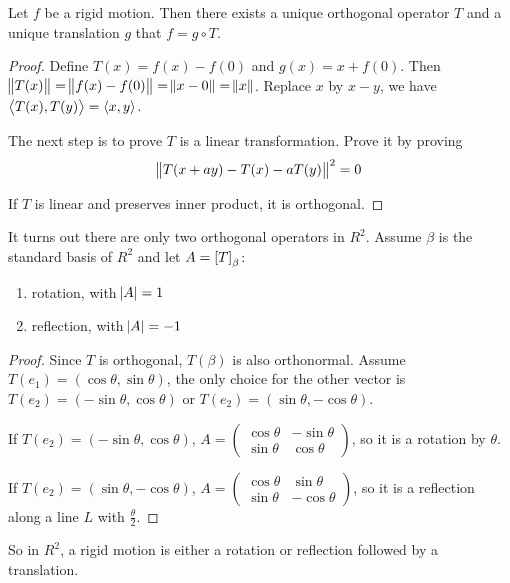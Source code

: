 \begin{theorem}
    Let $f$ be a rigid motion. Then there exists a unique orthogonal operator $T$ and a unique translation $g$ that $f = g  \circ T$.
\end{theorem}
\begin{proof}
    Define $T(x) = f(x) - f(0)$ and $g(x) = x + f(0)$. Then $\norm{T(x)} = \norm{f(x) - f(0)} = \norm{x - 0} = \norm{x}$. Replace $x$ by $x-y$, we have $\left\langle \displaystyle T(x), T(y) \right\rangle = \left\langle \displaystyle x, y \right\rangle$.
    
    The next step is to prove $T$ is a linear transformation. Prove it by proving 
    \begin{equation*}
        \norm{T(x + a y) - T(x) - aT(y)}^2 = 0
    \end{equation*}
    
    If $T$ is linear and preserves inner product, it is orthogonal.
\end{proof}


It turns out there are only two orthogonal operators in $R^2$. Assume $\beta$ is the standard basis of $R^2$ and let $A = \coordinate{T}_\beta$:
\begin{enumerate}
    \item rotation, with $\abs{A} = 1$
    \item reflection, with $\abs{A} = -1$
\end{enumerate}
\begin{proof}
    Since $T$ is orthogonal, $T(\beta)$ is also orthonormal. Assume $T(e_1) = (\cos \theta, \sin \theta)$, the only choice for the other vector is $T(e_2) = (- \sin \theta, \cos \theta)$ or $T(e_2) = (\sin \theta, - \cos \theta)$.
    
    If $T(e_2) = (- \sin \theta, \cos \theta)$, $A = \begin{pmatrix}
                \cos \theta & - \sin \theta \\
        \sin \theta & \cos \theta
    \end{pmatrix}$, so it is a rotation by $\theta$.
    
    If $T(e_2) = (\sin \theta, - \cos \theta)$, $A = \begin{pmatrix}
        \cos \theta & \sin \theta \\
        \sin \theta & -\cos \theta
    \end{pmatrix}$, so it is a reflection along a line $L$ with $\displaystyle \frac{\theta}{2}$.
\end{proof}

So in $R^2$, a rigid motion is either a rotation or reflection followed by a translation.


